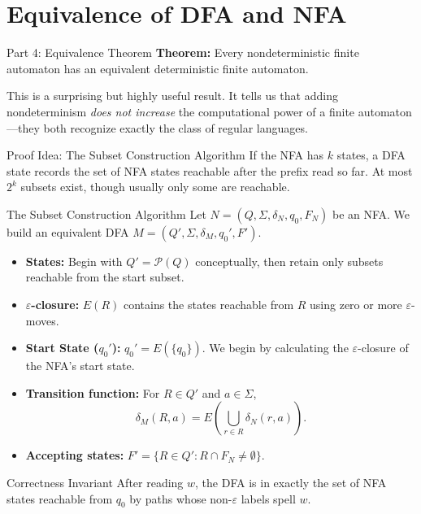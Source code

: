 \documentclass[10pt]{beamer}
\begin{document}
\section{Equivalence of DFA and NFA}

\begin{frame}{Part 4: Equivalence Theorem}
  \small
  \textbf{Theorem:} Every nondeterministic finite automaton has an equivalent deterministic finite automaton.
  \vspace{0.2cm}
  
  \pause
  This is a surprising but highly useful result. It tells us that adding nondeterminism \textit{does not increase} the computational power of a finite automaton—they both recognize exactly the class of regular languages.
  \pause
  
  \begin{block}{Proof Idea: The Subset Construction Algorithm}
    If the NFA has $k$ states, a DFA state records the set of NFA states
    reachable after the prefix read so far. At most $2^k$ subsets exist, though
    usually only some are reachable.
  \end{block}
\end{frame}

\begin{frame}{The Subset Construction Algorithm}
  \small
  Let $N = (Q, \Sigma, \delta_N, q_0, F_N)$ be an NFA. We build an equivalent DFA $M = (Q', \Sigma, \delta_M, q_0', F')$.
  \pause
  \begin{itemize}
      \item \textbf{States:} Begin with $Q'=\mathcal{P}(Q)$ conceptually, then
        retain only subsets reachable from the start subset.
      \pause
      \item \textbf{$\varepsilon$-closure:} $E(R)$ contains the states reachable
        from $R$ using zero or more $\varepsilon$-moves.
      \pause
      \item \textbf{Start State ($q_0'$):} $q_0' = E(\{q_0\})$. We begin by calculating the $\varepsilon$-closure of the NFA's start state.
      \pause
      \item \textbf{Transition function:} For $R\in Q'$ and $a\in\Sigma$,
      \[
        \delta_M(R,a)=E\!\left(\bigcup_{r\in R}\delta_N(r,a)\right).
      \]
      \pause
      \item \textbf{Accepting states:}
        $F'=\{R\in Q':R\cap F_N\neq\emptyset\}$.
  \end{itemize}
  \begin{exampleblock}{Correctness Invariant}
    After reading $w$, the DFA is in exactly the set of NFA states reachable
    from $q_0$ by paths whose non-$\varepsilon$ labels spell $w$.
  \end{exampleblock}
\end{frame}
\end{document}
